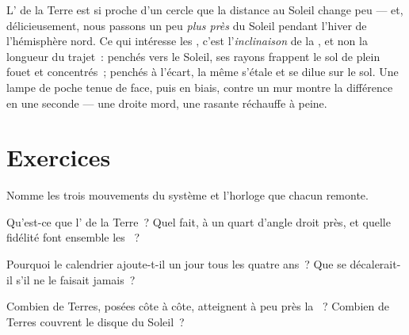 \begin{remark}\label{rem:g6:sun-earth-moon:notdistance}
L' de la Terre est si proche d'un cercle que la distance au
Soleil change peu --- et, délicieusement, nous passons un peu
\emph{plus près} du Soleil pendant l'hiver de l'hémisphère nord. Ce
qui intéresse les , c'est l'\emph{inclinaison} de la ,
et non la longueur du trajet~: penchés vers le Soleil, ses rayons
frappent le sol de plein fouet et concentrés~; penchés à l'écart, la
même  s'étale et se dilue sur le sol. Une lampe de poche
tenue de face, puis en biais, contre un mur montre la différence en
une seconde --- une  droite mord, une  rasante
réchauffe à peine.
\end{remark}

\section{Exercices}

\begin{exercise}[$\star$]\label{exo:g6:sun-earth-moon:1}
Nomme les trois mouvements du système et l'horloge que chacun
remonte.
\end{exercise}

\begin{exercise}[$\star$]\label{exo:g6:sun-earth-moon:2}
Qu'est-ce que l' de la Terre~? Quel fait, à un quart d'angle
droit près, et quelle fidélité font ensemble les ~?
\end{exercise}

\begin{exercise}[$\star$]\label{exo:g6:sun-earth-moon:3}
Pourquoi le calendrier ajoute-t-il un jour tous les quatre ans~? Que
se décalerait-il s'il ne le faisait jamais~?
\end{exercise}

\begin{exercise}[$\star$]\label{exo:g6:sun-earth-moon:4}
Combien de Terres, posées côte à côte, atteignent à peu près la
~? Combien de Terres couvrent le disque du Soleil~?
\end{exercise}

